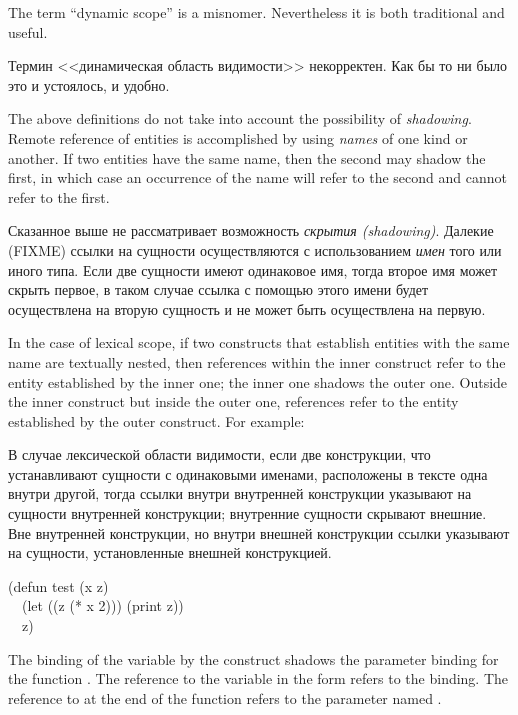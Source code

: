 \begin{newer}
The term ``dynamic scope'' is a misnomer.  Nevertheless
it is both traditional and useful.

Термин <<динамическая область видимости>> некорректен. Как бы то ни было это и
устоялось, и удобно.
\end{newer}

The above definitions do not take into account the possibility of
\emph{shadowing}.  Remote reference of entities is accomplished by using
\emph{names} of one kind or another.  If two entities have the same name,
then the second may shadow the first, in which case an occurrence
of the name will refer to the second and cannot refer to the first.

Сказанное выше не рассматривает возможность \emph{скрытия
  (shadowing)}. Далекие (FIXME) ссылки на сущности осуществляются с
использованием \emph{имен} того или иного типа. Если две сущности имеют
одинаковое имя, тогда второе имя может скрыть первое, в таком случае ссылка с
помощью этого имени будет осуществлена на вторую сущность и не может быть
осуществлена на первую.

In the case of lexical scope,
if two constructs that establish entities
with the same name are textually nested, then references within the inner
construct refer to the entity established by the inner one; the inner one
shadows the outer one.  Outside the inner construct but inside the outer one,
references refer to the entity established by the outer construct.
For example:

В случае лексической области видимости,
если две конструкции, что устанавливают сущности с одинаковыми именами,
расположены в тексте одна внутри другой, тогда ссылки внутри внутренней
конструкции указывают на сущности внутренней конструкции; внутренние сущности
скрывают внешние. Вне внутренней конструкции, но внутри внешней конструкции
ссылки указывают на сущности, установленные внешней конструкцией.

\begin{lisp}
(defun test (x z) \\
~~(let ((z (* x 2))) (print z)) \\
~~z)
\end{lisp}

The binding of the variable  by the  construct shadows
the parameter binding for the function .  The reference to the
variable  in the  form refers to the  binding.
The reference to  at the end of the function refers to the parameter
named .

